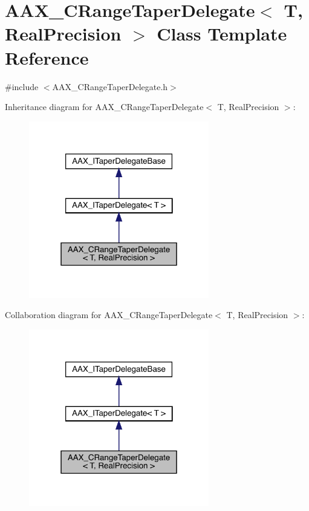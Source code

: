 \hypertarget{a01557}{}\section{A\+A\+X\+\_\+\+C\+Range\+Taper\+Delegate$<$ T, Real\+Precision $>$ Class Template Reference}
\label{a01557}


{\ttfamily \#include $<$A\+A\+X\+\_\+\+C\+Range\+Taper\+Delegate.\+h$>$}



Inheritance diagram for A\+A\+X\+\_\+\+C\+Range\+Taper\+Delegate$<$ T, Real\+Precision $>$\+:
\nopagebreak
\begin{figure}[H]
\begin{center}
\leavevmode
\includegraphics[width=223pt]{a01556}
\end{center}
\end{figure}


Collaboration diagram for A\+A\+X\+\_\+\+C\+Range\+Taper\+Delegate$<$ T, Real\+Precision $>$\+:
\nopagebreak
\begin{figure}[H]
\begin{center}
\leavevmode
\includegraphics[width=223pt]{a01555}
\end{center}
\end{figure}



